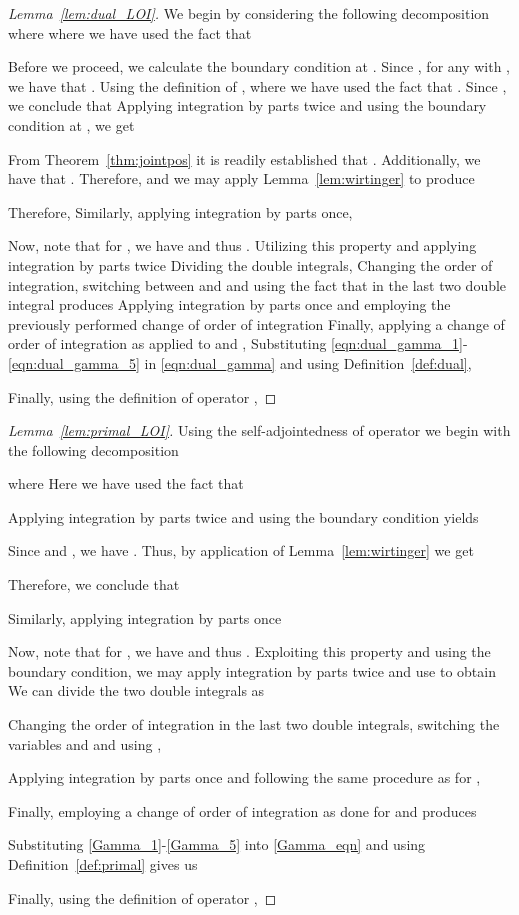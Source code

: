 \documentclass[US letter, 9 pt, conference]{ieeeconf}  \usepackage{setspace}
\begin{document}
\begin{proof}[Lemma~\ref{lem:dual_LOI}]
We begin by considering the following decomposition
 where
 where we have used the fact that


Before we proceed, we calculate the boundary condition at . Since , for any  with , we have that . Using the definition of ,
 where we have used the fact that . Since , we conclude that
 Applying integration by parts twice and using the boundary condition at , we get

 
From Theorem~\ref{thm:jointpos} it is readily established that . Additionally, we have that . Therefore,  and we may apply Lemma~\ref{lem:wirtinger} to produce

Therefore, 
Similarly, applying integration by parts once,

Now, note that for , we have  and thus . Utilizing this property and applying integration by parts twice
 Dividing the double integrals,
 Changing the order of integration, switching between  and  and using the fact that  in the last two double integral produces
  Applying integration by parts once and employing the previously performed change of order of integration
  Finally, applying a change of order of integration as applied to  and ,
 Substituting \eqref{eqn:dual_gamma_1}-\eqref{eqn:dual_gamma_5} in \eqref{eqn:dual_gamma} and using Definition~\ref{def:dual},

Finally, using the definition of operator ,

\end{proof}

\begin{proof}[Lemma~\ref{lem:primal_LOI}]
Using the self-adjointedness of operator  we begin with the following decomposition

 where
  Here we have used the fact that



Applying integration by parts twice and using the boundary condition  yields
 
 Since  and , we have . Thus, by application of Lemma~\ref{lem:wirtinger} we get
 
Therefore, we conclude that
 
Similarly, applying integration by parts once
 
Now, note that for , we have  and thus . Exploiting this property and using the boundary condition, we may apply integration by parts twice and use  to obtain 
 We can divide the two double integrals as

  Changing the order of integration in the last two double integrals, switching the variables  and  and using ,
 
  Applying integration by parts once and following the same procedure as for ,
  
Finally, employing a change of order of integration as done for  and  produces
 
 Substituting \eqref{Gamma_1}-\eqref{Gamma_5} into \eqref{Gamma_eqn} and using Definition~\ref{def:primal} gives us
  
 Finally, using the definition of operator ,
 
\end{proof}
\end{document}
